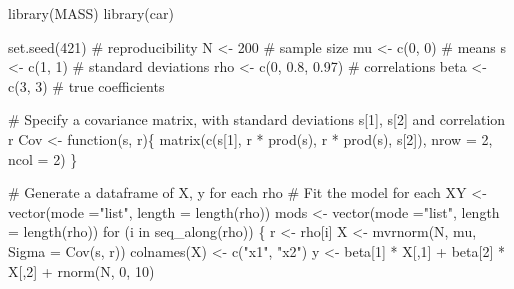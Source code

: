 \documentclass[
  letterpaper,
  10pt,
  krantz2]{krantz}
\makeatletter
\newenvironment{Shaded}{\begin{snugshade}}{\end{snugshade}}
\newcommand{\AttributeTok}[1]{\textcolor[rgb]{0.40,0.45,0.13}{#1}}
\newcommand{\CommentTok}[1]{\textcolor[rgb]{0.37,0.37,0.37}{#1}}
\newcommand{\ControlFlowTok}[1]{\textcolor[rgb]{0.00,0.23,0.31}{#1}}
\newcommand{\DecValTok}[1]{\textcolor[rgb]{0.68,0.00,0.00}{#1}}
\newcommand{\FloatTok}[1]{\textcolor[rgb]{0.68,0.00,0.00}{#1}}
\newcommand{\FunctionTok}[1]{\textcolor[rgb]{0.28,0.35,0.67}{#1}}
\newcommand{\NormalTok}[1]{\textcolor[rgb]{0.00,0.23,0.31}{#1}}
\newcommand{\OtherTok}[1]{\textcolor[rgb]{0.00,0.23,0.31}{#1}}
\newcommand{\SpecialCharTok}[1]{\textcolor[rgb]{0.37,0.37,0.37}{#1}}
\newcommand{\StringTok}[1]{\textcolor[rgb]{0.13,0.47,0.30}{#1}}
\newenvironment{kframe}{%
  \medskip{}
  \setlength{\fboxsep}{.8em}
  \def\at@end@of@kframe{}%
  \ifinner\ifhmode%
  \def\at@end@of@kframe{\end{minipage}}%
  \begin{minipage}{\columnwidth}%
  \fi\fi%
  \def\FrameCommand##1{\hskip\@totalleftmargin \hskip-\fboxsep
  \colorbox{shadecolor}{##1}\hskip-\fboxsep
      \hskip-\linewidth \hskip-\@totalleftmargin \hskip\columnwidth}%
  \MakeFramed {\advance\hsize-\width
    \@totalleftmargin\z@ \linewidth\hsize
    \@setminipage}}%
{\par\unskip\endMakeFramed%
  \at@end@of@kframe}
\renewenvironment{Shaded}{\begin{kframe}}{\end{kframe}}
\makeatother
\begin{document}
\begin{Shaded}
\begin{Highlighting}[]
\FunctionTok{library}\NormalTok{(MASS)}
\FunctionTok{library}\NormalTok{(car)}

\FunctionTok{set.seed}\NormalTok{(}\DecValTok{421}\NormalTok{)            }\CommentTok{\# reproducibility}
\NormalTok{N }\OtherTok{\textless{}{-}} \DecValTok{200}                 \CommentTok{\# sample size}
\NormalTok{mu }\OtherTok{\textless{}{-}} \FunctionTok{c}\NormalTok{(}\DecValTok{0}\NormalTok{, }\DecValTok{0}\NormalTok{)            }\CommentTok{\# means}
\NormalTok{s }\OtherTok{\textless{}{-}} \FunctionTok{c}\NormalTok{(}\DecValTok{1}\NormalTok{, }\DecValTok{1}\NormalTok{)             }\CommentTok{\# standard deviations}
\NormalTok{rho }\OtherTok{\textless{}{-}} \FunctionTok{c}\NormalTok{(}\DecValTok{0}\NormalTok{, }\FloatTok{0.8}\NormalTok{, }\FloatTok{0.97}\NormalTok{)   }\CommentTok{\# correlations}
\NormalTok{beta }\OtherTok{\textless{}{-}} \FunctionTok{c}\NormalTok{(}\DecValTok{3}\NormalTok{, }\DecValTok{3}\NormalTok{)          }\CommentTok{\# true coefficients}

\CommentTok{\# Specify a covariance matrix, with standard deviations s[1], s[2] and correlation r}
\NormalTok{Cov }\OtherTok{\textless{}{-}} \ControlFlowTok{function}\NormalTok{(s, r)\{}
  \FunctionTok{matrix}\NormalTok{(}\FunctionTok{c}\NormalTok{(s[}\DecValTok{1}\NormalTok{],    r }\SpecialCharTok{*} \FunctionTok{prod}\NormalTok{(s),}
\NormalTok{         r }\SpecialCharTok{*} \FunctionTok{prod}\NormalTok{(s), s[}\DecValTok{2}\NormalTok{]), }\AttributeTok{nrow =} \DecValTok{2}\NormalTok{, }\AttributeTok{ncol =} \DecValTok{2}\NormalTok{)}
\NormalTok{\}}

\CommentTok{\# Generate a dataframe of X, y for each rho}
\CommentTok{\# Fit the model for each}
\NormalTok{XY }\OtherTok{\textless{}{-}} \FunctionTok{vector}\NormalTok{(}\AttributeTok{mode =}\StringTok{"list"}\NormalTok{, }\AttributeTok{length =} \FunctionTok{length}\NormalTok{(rho))}
\NormalTok{mods }\OtherTok{\textless{}{-}} \FunctionTok{vector}\NormalTok{(}\AttributeTok{mode =}\StringTok{"list"}\NormalTok{, }\AttributeTok{length =} \FunctionTok{length}\NormalTok{(rho))}
\ControlFlowTok{for}\NormalTok{ (i }\ControlFlowTok{in} \FunctionTok{seq\_along}\NormalTok{(rho)) \{}
\NormalTok{  r }\OtherTok{\textless{}{-}}\NormalTok{ rho[i]}
\NormalTok{  X }\OtherTok{\textless{}{-}} \FunctionTok{mvrnorm}\NormalTok{(N, mu, }\AttributeTok{Sigma =} \FunctionTok{Cov}\NormalTok{(s, r))}
  \FunctionTok{colnames}\NormalTok{(X) }\OtherTok{\textless{}{-}} \FunctionTok{c}\NormalTok{(}\StringTok{"x1"}\NormalTok{, }\StringTok{"x2"}\NormalTok{)}
\NormalTok{  y }\OtherTok{\textless{}{-}}\NormalTok{ beta[}\DecValTok{1}\NormalTok{] }\SpecialCharTok{*}\NormalTok{ X[,}\DecValTok{1}\NormalTok{] }\SpecialCharTok{+}\NormalTok{ beta[}\DecValTok{2}\NormalTok{] }\SpecialCharTok{*}\NormalTok{ X[,}\DecValTok{2}\NormalTok{] }\SpecialCharTok{+} \FunctionTok{rnorm}\NormalTok{(N, }\DecValTok{0}\NormalTok{, }\DecValTok{10}\NormalTok{)}


\end{Highlighting}
\end{Shaded}
\end{document}
